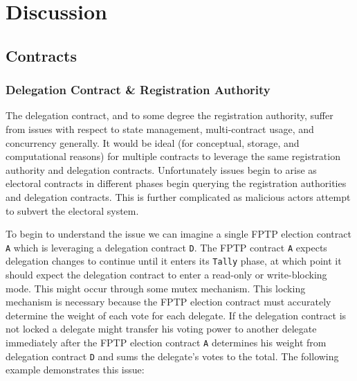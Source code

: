 \chapter{Discussion}\label{chap:discussion}

\section{Contracts}
\subsection{Delegation Contract \& Registration Authority}
The delegation contract, and to some degree the registration authority, suffer
from issues with respect to state management, multi-contract usage, and
concurrency generally. It would be ideal (for conceptual, storage, and
computational reasons) for multiple contracts to leverage the same registration
authority and delegation contracts. Unfortunately issues begin to arise as
electoral contracts in different phases begin querying the registration
authorities and delegation contracts. This is further complicated as malicious
actors attempt to subvert the electoral system.

To begin to understand the issue we can imagine a single FPTP election contract
\lstinline|A| which is leveraging a delegation contract \lstinline|D|. The FPTP
contract \lstinline|A| expects delegation changes to continue until it enters
its \lstinline|Tally| phase, at which point it should expect the delegation
contract to enter a read-only or write-blocking mode. This might occur through
some mutex mechanism. This locking mechanism is necessary because the FPTP
election contract must accurately determine the weight of each vote for each
delegate. If the delegation contract is not locked a delegate might transfer his
voting power to another delegate immediately after the FPTP election contract
\lstinline|A| determines his weight from delegation contract \lstinline|D| and
sums the delegate's votes to the total. The following example demonstrates this
issue:

